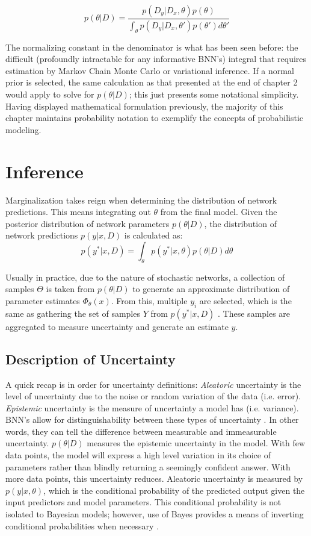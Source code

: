 $$
p(\theta|D) = \frac{p(D_{y}|D_{x},\theta)p(\theta)}{\int_\theta p(D_{y}|D_{x},\theta')p(\theta')d\theta'}
$$

The normalizing constant in the denominator is what has been seen before: the difficult (profoundly intractable for any informative BNN's) integral that requires estimation by Markov Chain Monte Carlo or variational inference.  If a normal prior is selected, the same calculation as that presented at the end of chapter 2 would apply to solve for $p(\theta|D)$; this just presents some notational simplicity.  Having displayed mathematical formulation previously, the majority of this chapter maintains probability notation to exemplify the concepts of probabilistic modeling.



\section{Inference}

Marginalization takes reign when determining the distribution of network predictions.  This means integrating out $\theta$ from the final model.  Given the posterior distribution of network parameters $p(\theta|D)$, the distribution of network predictions $p(y|x,D)$ is calculated as:
$$
p(y^*|x,D) = \int_\theta p(y^*|x,\theta)p(\theta|D)d\theta
$$

Usually in practice, due to the nature of stochastic networks, a collection of samples $\Theta$ is taken from $p(\theta|D)$ to generate an approximate distribution of parameter estimates $\Phi_{\theta}(x)$.  From this, multiple $y_i$ are selected, which is the same as gathering the set of samples $Y$ from $p(y^*|x,D)$ \cite{Jospin}. These samples are aggregated to measure uncertainty and generate an estimate $\hat{y}$.

\subsection{Description of Uncertainty}

A quick recap is in order for uncertainty definitions: \textit{Aleatoric} uncertainty is the level of uncertainty due to the noise or random variation of the data (i.e. error).  \textit{Epistemic} uncertainty is the measure of uncertainty a model has (i.e. variance).  BNN's allow for distinguishability between these types of uncertainty \cite{Jospin}.  In other words, they can tell the difference between measurable and immeasurable uncertainty.   $p(\theta|D)$ measures the epistemic uncertainty in the model.  With few data points, the model will express a high level variation in its choice of parameters rather than blindly returning a seemingly confident answer.  With more data points, this uncertainty reduces.
Aleatoric uncertainty is measured by $p(y|x,\theta)$, which is the conditional probability of the predicted output given the input predictors and model parameters.  This conditional probability is not isolated to Bayesian models; however, use of Bayes provides a means of inverting conditional probabilities when necessary \cite{Jospin}.

